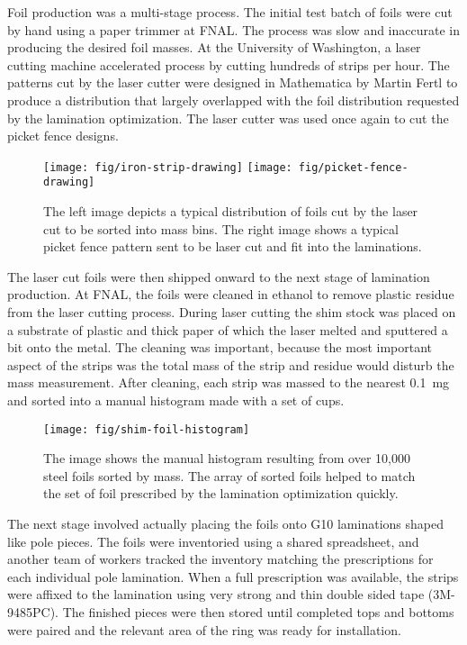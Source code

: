 Foil production was a multi-stage process.  The initial test batch of foils were cut by hand using a paper trimmer at FNAL.  The process was slow and inaccurate in producing the desired foil masses.  At the University of Washington, a laser cutting machine accelerated process by cutting hundreds of strips per hour.  The patterns cut by the laser cutter were designed in Mathematica by Martin Fertl to produce a distribution that largely overlapped with the foil distribution requested by the lamination optimization.  The laser cutter was used once again to cut the picket fence designs.

\begin{figure}
\centering
\texttt{[image: fig/iron-strip-drawing]}
\texttt{[image: fig/picket-fence-drawing]}
\caption{
    The left image depicts a typical distribution of foils cut by the laser cut to be sorted into mass bins.  The right image shows a typical picket fence pattern sent to be laser cut and fit into the laminations.
    \label{fig:laser-cutter-drawings}
}
\end{figure}

The laser cut foils were then shipped onward to the next stage of lamination production.  At FNAL, the foils were cleaned in ethanol to remove plastic residue from the laser cutting process.  During laser cutting the shim stock was placed on a substrate of plastic and thick paper of which the laser melted and sputtered a bit onto the metal.  The cleaning was important, because the most important aspect of the strips was the total mass of the strip and residue would disturb the mass measurement.  After cleaning, each strip was massed to the nearest \SI{0.1}{\milli\gram} and sorted into a manual histogram made with a set of cups.

\begin{figure}
\centering
\texttt{[image: fig/shim-foil-histogram]}
\caption{
    The image shows the manual histogram resulting from over 10,000 steel foils sorted by mass.  The array of sorted foils helped to match the set of foil prescribed by the lamination optimization quickly.
    \label{fig:shim-foil-histogram}
}
\end{figure}

The next stage involved actually placing the foils onto G10 laminations shaped like pole pieces.  The foils were inventoried using a shared spreadsheet, and another team of workers tracked the inventory matching the prescriptions for each individual pole lamination.  When a full prescription was available, the strips were affixed to the lamination using very strong and thin double sided tape (3M-9485PC).  The finished pieces were then stored until completed tops and bottoms were paired and the relevant area of the ring was ready for installation.

